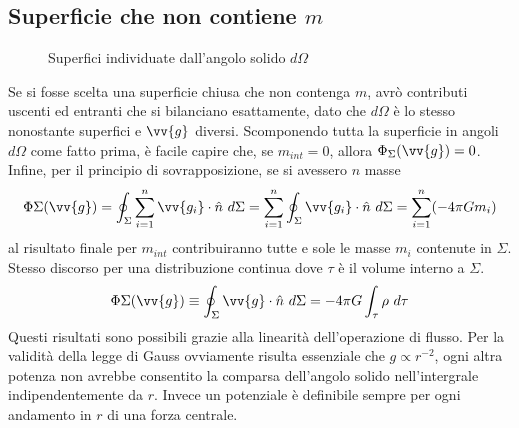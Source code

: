 \documentclass[a4paper, oneside]{book}
\begin{document}
\subsection{Superficie che non contiene $m$}
\begin{figure}
    \centering
    \caption{Superfici individuate dall'angolo solido $d\Omega$}
\end{figure}
Se si fosse scelta una superficie chiusa che non contenga $m$, avrò contributi 
uscenti ed entranti che si bilanciano esattamente, dato che $d \Omega$ è lo stesso 
nonostante superfici e $\vv{g}$ diversi. Scomponendo tutta la superficie in angoli $d\Omega$ 
come fatto prima, è facile capire che, se $m_{int} = 0$, allora $\Phi_\Sigma(\vv{g} ) = 0$. 
Infine, per il principio di sovrapposizione, se si avessero $n$ masse
\begin{gather*}
    \Phi\Sigma(\vv{g} ) = \oint _{\Sigma} \sum_{i = 1}^{n} \vv{g_i} \cdot \hat{n} \ d\Sigma = \sum_{i = 1}^{n} \oint _{\Sigma} \vv{g_i} \cdot \hat{n} \ d\Sigma  =\sum_{i = 1}^{n} (-4\pi Gm_i)       
\end{gather*}
al risultato finale per $m_{int}$ contribuiranno tutte e sole le masse $m_i$ contenute in $\Sigma$. Stesso 
discorso per una distribuzione continua dove $\tau$ è il volume interno a $\Sigma$. 
\begin{align}
    \Phi\Sigma (\vv{g} ) \equiv \oint _{\Sigma} \vv{g} \cdot \hat{n} \ d\Sigma = -4\pi G \int_{\tau} \rho \ d\tau   
\end{align}
Questi risultati sono possibili grazie alla linearità dell'operazione di flusso. Per la validità della legge di Gauss 
ovviamente risulta essenziale che $g \propto r^{-2}$, ogni altra potenza non avrebbe 
consentito la comparsa dell'angolo solido nell'intergrale indipendentemente da $r$. 
Invece un potenziale è definibile sempre per ogni andamento in $r$ di una 
forza centrale.
\end{document}
